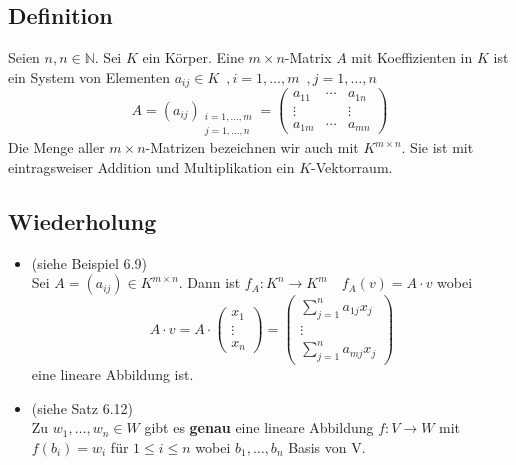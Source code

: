 \subsection{Definition} %
\label{sub:definition}
Seien $n,n \in \mathds{N}$. Sei $K$ ein Körper. Eine \(m \times n \)-Matrix  $A$ mit Koeffizienten in $K$ ist ein System von Elementen
$a_{ij} \in K \enspace , i=1, \ldots , m \enspace , j=1, \ldots , n$
\[
	A = (a_{ij})_{\substack{i=1, \ldots , m \\ j=1, \ldots , n}} = 
	\begin{pmatrix}
		a_{11} & \cdots & a_{1n} \\
		\vdots & & \vdots \\
		a_{1m} & \cdots & a_{mn}
	\end{pmatrix}
\]
Die Menge aller \(m \times n \)-Matrizen bezeichnen wir auch mit $K^{m \times n}$. Sie ist mit eintragsweiser Addition und Multiplikation ein \(K\)-Vektorraum.

\subsection{Wiederholung} %
\label{sub:wiederholung}
\begin{itemize}
	\item (siehe Beispiel 6.9)\\
	Sei $A= (a_{ij}) \in K^{m \times n}$. Dann ist $f_A : K^n \to K^m \quad f_A(v)=A \cdot v$ wobei
	\[
		A \cdot v = A \cdot \begin{pmatrix} x_1 \\ \vdots \\ x_n \end{pmatrix} = 
		\begin{pmatrix}
			\sum\limits_{j=1}^{n} a_{1j} x_j \\
			\vdots \\
			\sum\limits_{j=1}^{n} a_{mj} x_j
		\end{pmatrix}
	\]
	eine lineare Abbildung ist.
	\item (siehe Satz 6.12) \\
	Zu $w_1, \ldots , w_n \in W$ gibt es \textbf{genau} eine lineare Abbildung $f: V \to W$ mit $f(b_i)=w_i$ für $1 \le i \le n$
	wobei $b_1, \ldots , b_n$ Basis von V.
\end{itemize}

